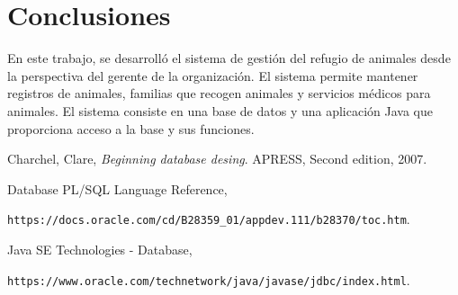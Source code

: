 \documentclass{FR16}
\begin{document}
\section{Conclusiones}
\begin{center}
En este trabajo, se desarrolló el sistema de gestión del refugio de animales desde la perspectiva del gerente de la organización. El sistema permite mantener registros de animales, familias que recogen animales y servicios médicos para animales. El sistema consiste en una base de datos y una aplicación Java que proporciona acceso a la base y sus funciones.
\end{center}

\newpage
\begin{thebibliography}{9}

Charchel, Clare, \emph{Beginning database desing}. APRESS, Second edition, 2007.

Database PL/SQL Language Reference, 

\hspace{10mm}\texttt{https://docs.oracle.com/cd/B28359_01/appdev.111/b28370/toc.htm}.

Java SE Technologies - Database, 

\hspace{10mm}\texttt{https://www.oracle.com/technetwork/java/javase/jdbc/index.html}.
\end{thebibliography}
\end{document}

